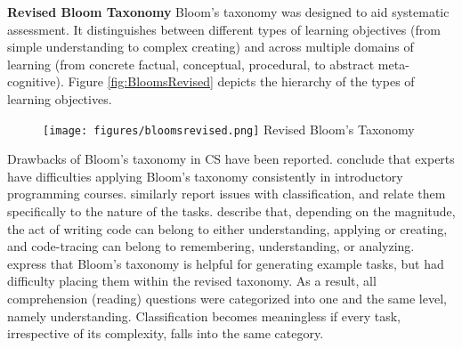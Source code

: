 \noindent \textbf{Revised Bloom Taxonomy}\newline
Bloom's taxonomy was designed to aid systematic assessment. It distinguishes between different types of learning objectives (from simple understanding to complex creating) and across multiple domains of learning (from concrete factual, conceptual, procedural, to abstract meta-cognitive)\cite{krathwohl2002revision}. Figure \ref{fig:BloomsRevised} depicts the hierarchy of the types of learning objectives.



\begin{figure}
\texttt{[image: figures/bloomsrevised.png]}
Revised Bloom's Taxonomy
\end{figure}\label{fig:BloomsRevised}




Drawbacks of Bloom's taxonomy in CS have been reported.  conclude that experts have difficulties applying Bloom's taxonomy consistently in introductory programming courses.  similarly report issues with classification, and relate them specifically to the nature of the tasks.  describe that, depending on the magnitude, the act of writing code can belong to either understanding, applying or creating, and code-tracing can belong to remembering, understanding, or analyzing.  express that Bloom's taxonomy is helpful for generating example tasks, but had difficulty placing them within the revised taxonomy. As a result, all comprehension (reading) questions were categorized into one and the same level, namely understanding. Classification becomes meaningless if every task, irrespective of its complexity, falls into the same category.


